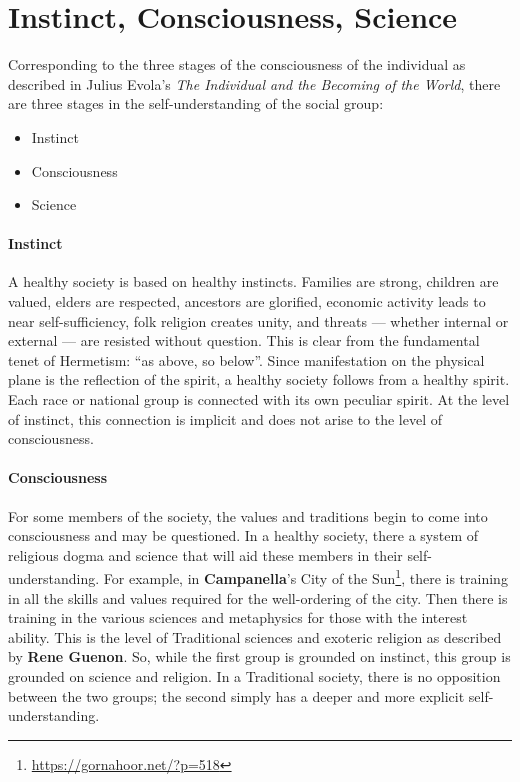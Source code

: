 \section{Instinct, Consciousness, Science}

Corresponding to the three stages of the consciousness of the individual as described in Julius Evola's \textit{The Individual and the Becoming of the World}, there are three stages in the self-understanding of the social group:

\begin{itemize}


\item Instinct

\item Consciousness

\item Science
\end{itemize}


\paragraph{Instinct}


A healthy society is based on healthy instincts. Families are strong, children are valued, elders are respected, ancestors are glorified, economic activity leads to near self-sufficiency, folk religion creates unity, and threats --- whether internal or external --- are resisted without question. This is clear from the fundamental tenet of Hermetism: ``as above, so below''. Since manifestation on the physical plane is the reflection of the spirit, a healthy society follows from a healthy spirit. Each race or national group is connected with its own peculiar spirit. At the level of instinct, this connection is implicit and does not arise to the level of consciousness.

\paragraph{Consciousness}


For some members of the society, the values and traditions begin to come into consciousness and may be questioned. In a healthy society, there a system of religious dogma and science that will aid these members in their self-understanding. For example, in \textbf{Campanella}'s City of the Sun\footnote{\url{https://gornahoor.net/?p=518}}, there is training in all the skills and values required for the well-ordering of the city. Then there is training in the various sciences and metaphysics for those with the interest ability. This is the level of Traditional sciences and exoteric religion as described by \textbf{Rene Guenon}. So, while the first group is grounded on instinct, this group is grounded on science and religion. In a Traditional society, there is no opposition between the two groups; the second simply has a deeper and more explicit self-understanding.

